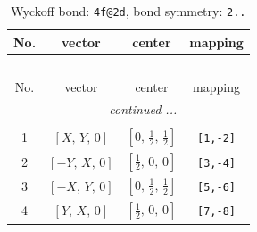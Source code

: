 \documentclass[fleqn,8pt]{jsarticle}
\begin{document}
\renewcommand{\arraystretch}{1.2}
\begin{longtable}{cccc}
\caption{Wyckoff bond: {\tt 4f@2d}, bond symmetry: {\tt 2..}}
 \\
 \hline \hline
No. & vector & center & mapping \\ \hline \endfirsthead

\multicolumn{3}{l}{\tablename\ \thetable{}} \\
 \hline \hline
No. & vector & center & mapping \\ \hline \endhead

 \hline \hline
\multicolumn{3}{r}{\footnotesize\it continued ...} \\ \endfoot

 \hline \hline
\multicolumn{3}{r}{} \\ \endlastfoot

1 & $\left[ X,\, Y,\, 0 \right]$ & $\left[ 0,\, \frac{1}{2},\, \frac{1}{2} \right]$ & {\tt [1,-2]} \\ \hline
2 & $\left[ - Y,\, X,\, 0 \right]$ & $\left[ \frac{1}{2},\, 0,\, 0 \right]$ & {\tt [3,-4]} \\ \hline
3 & $\left[ - X,\, Y,\, 0 \right]$ & $\left[ 0,\, \frac{1}{2},\, \frac{1}{2} \right]$ & {\tt [5,-6]} \\ \hline
4 & $\left[ Y,\, X,\, 0 \right]$ & $\left[ \frac{1}{2},\, 0,\, 0 \right]$ & {\tt [7,-8]} \\
\end{longtable}
\renewcommand{\arraystretch}{1.2}
\end{document}
